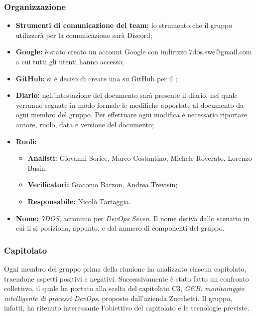 \subsubsection{Organizzazione}
\begin{itemize}
	\item { \textbf{Strumenti di comunicazione del team:} lo strumento che il gruppo utilizzerà per la comunicazione sarà Discord;}
	\item{ \textbf{Google:} è stato creato un account Google con indirizzo 7dos.swe@gmail.com a cui tutti gli utenti hanno accesso;}
	\item { \textbf{GitHub:} si è deciso di creare una  su GitHub per il ;}
	\item { \textbf{Diario:} nell'intestazione del documento sarà presente il diario, nel quale verranno segnate in modo formale le modifiche apportate al documento da ogni membro del gruppo.
		Per effettuare ogni modifica è necessario riportare autore, ruolo, data e versione del documento;}
	\item { \textbf{Ruoli:}  }
	\begin{itemize}
		\item { \textbf{Analisti:} Giovanni Sorice, Marco Costantino, Michele Roverato, Lorenzo Busin;}
		\item { \textbf{Verificatori:} Giacomo Barzon, Andrea Trevisin;}
		\item { \textbf{Responsabile:} Nicolò Tartaggia.}
	\end{itemize}
	\item { \textbf{Nome:} \emph{7DOS}, acronimo per \emph{DevOps Seven}. Il nome deriva dallo scenario in cui il  si posiziona,  appunto, e dal numero di componenti del gruppo.}
\end{itemize}

\subsubsection{Capitolato}
Ogni membro del gruppo prima della riunione ha analizzato ciascun capitolato, traendone aspetti positivi e negativi. Successivamente è stato fatto un confronto collettivo, il quale ha portato alla scelta del capitolato C3, \emph{G\&B: monitoraggio intelligente di processi DevOps}, proposto dall'azienda Zucchetti. Il gruppo, infatti, ha ritenuto interessante l'obiettivo del capitolato e le tecnologie previste.
